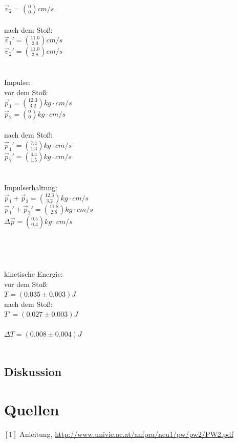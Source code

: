 \documentclass[12pt,a4paper]{article}
\begin{document}
\begin{multicols}{2}
$\vec v_2 =\binom{0}{0} cm/s$\\
\\
nach dem Stoß:\\
$\vec v_1' =\binom{11.0}{2.0} cm/s$\\
$\vec v_2 '=\binom{11.0}{3.8} cm/s$\\
\\
\\
Impulse:\\
vor dem Stoß:\\
$\vec p_1 =\binom{12.3}{3.2} kg\cdot cm/s$\\
$\vec p_2 =\binom{0}{0} kg\cdot cm/s$\\
\\
nach dem Stoß:\\
$\vec p_1' =\binom{7.4}{1.3} kg\cdot cm/s$\\
$\vec p_2 '=\binom{4.4}{1.5} kg\cdot cm/s$\\
\\
\\
Impulserhaltung:\\
$\vec p_1 + \vec p_2 = \binom{12.3}{3.2} kg\cdot cm/s$\\
$\vec p_1' + \vec p_2' = \binom{11.8}{2.8} kg\cdot cm/s$\\
$\Delta \vec p =  \binom{0.5}{0.4} kg\cdot cm/s$\\
\\
\\
\\
\\
kinetische Energie:\\
vor dem Stoß:\\
$T = (0.035 \pm 0.003) J$\\
nach dem Stoß:\\
$T'=(0.027 \pm 0.003) J$\\
\\
$\Delta T= (0.008 \pm 0.004) J$
\\
\\


\subsection{Diskussion}







\section{Quellen}
$[1]$ Anleitung, \url{http://www.univie.ac.at/anfpra/neu1/pw/pw2/PW2.pdf}\\
\end{multicols}
\end{document}
